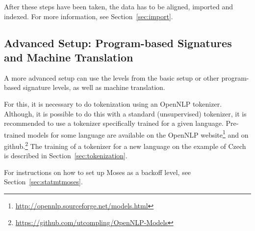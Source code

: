 After these steps have been taken, the data has to be aligned, imported and indexed. For more information, see Section~\ref{sec:import}.


\subsection{Advanced Setup: Program-based Signatures and Machine Translation}

A more advanced setup can use the levels from the basic setup or other program-based signature levels, as well as machine translation. 

For this, it is necessary to do tokenization using an OpenNLP tokenizer. Although, it is possible to do this with a standard (unsupervised) tokenizer, it is recommended to use a tokenizer specifically trained for a given language. Pre-trained models for some language are available on the OpenNLP website\footnote{\url{http://opennlp.sourceforge.net/models.html}} and on github.\footnote{\url{https://github.com/utcompling/OpenNLP-Models}} The training of a tokenizer for a new language on the example of Czech is described in Section~\ref{sec:tokenization}. 

For instructions on how to set up Moses as a backoff level, see Section~\ref{sec:statmtmoses}.



